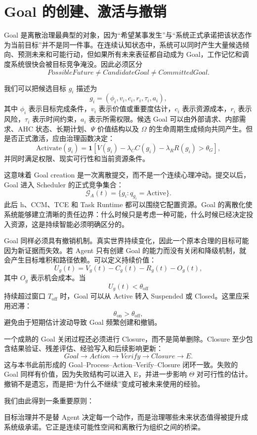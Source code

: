 \section{Goal 的创建、激活与撤销}

Goal 是离散治理最典型的对象，因为“希望某事发生”与“系统正式承诺把该状态作为当前目标”并不是同一件事。在连续认知状态中，系统可以同时产生大量候选倾向、预测未来和可能行动，但如果所有未来表征都自动成为 Goal，工作记忆和调度系统很快会被目标竞争淹没。因此必须区分
\[
PossibleFuture
\neq
CandidateGoal
\neq
CommittedGoal.
\]

我们可以把候选目标 \(g_i\) 描述为
\[
g_i
=
\left(
\phi_i,
v_i,
c_i,
r_i,
\tau_i,
a_i
\right),
\]
其中 \(\phi_i\) 表示目标完成条件，\(v_i\) 表示价值或重要度估计，\(c_i\) 表示资源成本，\(r_i\) 表示风险，\(\tau_i\) 表示时间约束，\(a_i\) 表示所需权限。候选 Goal 可以由外部请求、内部需求、AHC 状态、长期计划、\(\Psi\) 价值结构以及 \(\Omega\) 的生命周期生成倾向共同产生。但是否正式激活，应由治理函数决定：
\[
\mathrm{Activate}(g_i)
=
\mathbf 1
\left[
V(g_i)
-
\lambda_C C(g_i)
-
\lambda_R R(g_i)
>
\theta_G
\right],
\]
并同时满足权限、现实可行性和当前资源条件。

这意味着 Goal creation 是一次离散提交，而不是一个连续心理冲动。提交以后，Goal 进入 Scheduler 的正式竞争集合：
\[
\mathcal G_A(t)
=
\{
g_i:
q_{g_i}=\mathrm{Active}
\}.
\]
此后 h、CCM、TCE 和 Task Runtime 都可以围绕它配置资源。Goal 的离散化使系统能够建立清晰的责任边界：什么时候只是考虑一种可能，什么时候已经决定投入资源，这是持续智能必须明确区分的。

Goal 同样必须具有撤销机制。真实世界持续变化，因此一个原本合理的目标可能因为新证据而失效。若 Agent 只有创建 Goal 的能力而没有关闭和降级机制，就会产生目标堆积和路径依赖。可以定义持续价值：
\[
U_g(t)
=
V_g(t)
-
C_g(t)
-
R_g(t)
-
O_g(t),
\]
其中 \(O_g\) 表示机会成本。当
\[
U_g(t)<\theta_{\mathrm{off}}
\]
持续超过窗口 \(T_{\mathrm{off}}\) 时，Goal 可以从 Active 转入 Suspended 或 Closed。这里应采用迟滞：
\[
\theta_{\mathrm{on}}
>
\theta_{\mathrm{off}},
\]
避免由于短期估计波动导致 Goal 频繁创建和撤销。

一个成熟的 Goal 关闭过程还必须进行 Closure，而不是简单删除。Closure 至少包含结果验证、残差评估、经验写入和后续影响更新：
\[
Goal
\rightarrow
Action
\rightarrow
Verify
\rightarrow
Closure
\rightarrow
E.
\]
这与本书此前形成的 Goal--Process--Action--Verify--Closure 闭环一致。失败的 Goal 同样有价值，因为失败结构可以进入 E，并进一步影响 \(\Theta\) 对可行性的估计。撤销不是遗忘，而是把“为什么不继续”变成可被未来使用的经验。

我们由此得到一条重要原则：
\begin{statementbox}
\centering
{}
\end{statementbox}
目标治理并不是替 Agent 决定每一个动作，而是治理哪些未来状态值得被提升成系统级承诺。它正是连续可能性空间和离散行为组织之间的桥梁。


